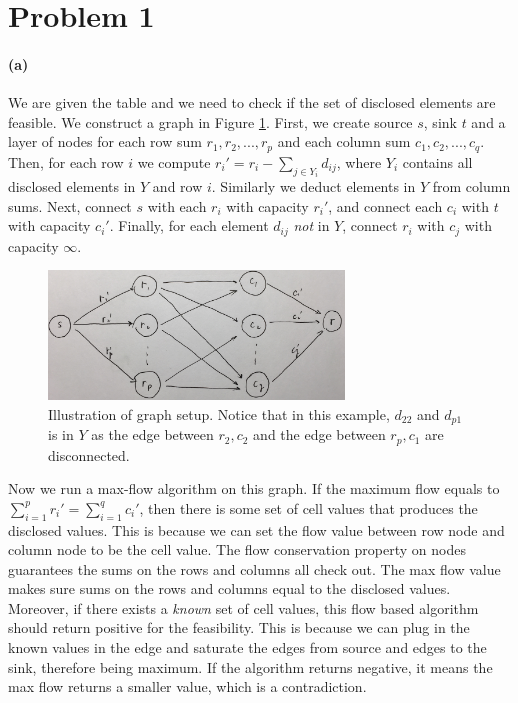 \documentclass[12pt]{article}
\begin{document}
	
\section*{Problem 1}
\paragraph{(a)}
We are given the table and we need to check if the set of disclosed elements are feasible. We construct a graph in Figure \ref{fig:1-a}. First, we create source $s$, sink $t$ and a layer of nodes for each row sum $r_1, r_2, ..., r_p$ and each column sum $c_1, c_2, ..., c_q$. Then, for each row $i$ we compute $r_i' = r_i - \sum_{j \in Y_i} d_{ij}$, where $Y_i$ contains all disclosed elements in $Y$ and row $i$. Similarly we deduct elements in $Y$ from column sums. Next, connect $s$ with each $r_i$ with capacity $r_i'$, and connect each $c_i$ with $t$ with capacity $c_i'$. Finally, for each element $d_{ij}$ \emph{not} in $Y$, connect $r_i$ with $c_j$ with capacity $\infty$.

\begin{figure}[h!]
	\centering
	\includegraphics[width=0.7\textwidth]{1-a.jpg}
	\caption{Illustration of graph setup. Notice that in this example, $d_{22}$ and $d_{p1}$ is in $Y$ as the edge between $r_2, c_2$ and the edge between $r_p, c_1$ are disconnected.}
	\label{fig:1-a}
\end{figure}

Now we run a max-flow algorithm on this graph. If the maximum flow equals to $\sum_{i=1}^{p} r_i'=\sum_{i=1}^{q} c_i'$, then there is some set of cell values that produces the disclosed values. This is because we can set the flow value between row node and column node to be the cell value. The flow conservation property on nodes guarantees the sums on the rows and columns all check out. The max flow value makes sure sums on the rows and columns equal to the disclosed values. Moreover, if there exists a \emph{known} set of cell values, this flow based algorithm should return positive for the feasibility. This is because we can plug in the known values in the edge and saturate the edges from source and edges to the sink, therefore being maximum. If the algorithm returns negative, it means the max flow returns a smaller value, which is a contradiction. 
\end{document}
